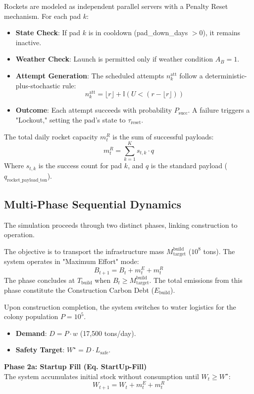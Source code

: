 \documentclass[11pt,letterpaper]{article}
\begin{document}
Rockets are modeled as independent parallel servers with a Penalty Reset mechanism. For each pad $k$:
\begin{itemize}
    \item \textbf{State Check}: If pad $k$ is in cooldown (pad\_down\_days $> 0$), it remains inactive.
    \item \textbf{Weather Check}: Launch is permitted only if weather condition $A_B = 1$.
    \item \textbf{Attempt Generation}: The scheduled attempts $n^{\text{att}}_k$ follow a deterministic-plus-stochastic rule:
    \[
    n^{\text{att}}_k = \lfloor r \rfloor + \mathbb{I}(U < (r - \lfloor r \rfloor))
    \]
    \item \textbf{Outcome}: Each attempt succeeds with probability $P_{\text{succ}}$. A failure triggers a "Lockout," setting the pad's state to $\tau_{\text{reset}}$.
\end{itemize}
The total daily rocket capacity $m^R_t$ is the sum of successful payloads:
\[
m^R_t = \sum_{k=1}^{K} s_{t,k} \cdot q
\]
Where $s_{t,k}$ is the success count for pad $k$, and $q$ is the standard payload ($q_{\text{rocket\_payload\_ton}}$).

\subsection{Multi-Phase Sequential Dynamics}
The simulation proceeds through two distinct phases, linking construction to operation.

The objective is to transport the infrastructure mass $M^{\text{build}}_{\text{target}}$ ($10^8$ tons). The system operates in "Maximum Effort" mode:
\[
B_{t+1} = B_t + m^E_t + m^R_t
\]
The phase concludes at $T_{\text{build}}$ when $B_t \ge M^{\text{build}}_{\text{target}}$. The total emissions from this phase constitute the Construction Carbon Debt ($E_{\text{build}}$).

Upon construction completion, the system switches to water logistics for the colony population $P=10^5$.
\begin{itemize}
    \item \textbf{Demand}: $D = P \cdot w$ (17,500 tons/day).
    \item \textbf{Safety Target}: $W^\star = D \cdot L_{\text{safe}}$.
\end{itemize}

\noindent \textbf{Phase 2a: Startup Fill (Eq. StartUp-Fill)} \\
The system accumulates initial stock without consumption until $W_t \ge W^\star$:
\[
W_{t+1} = W_t + m^E_t + m^R_t
\]
\end{document}
